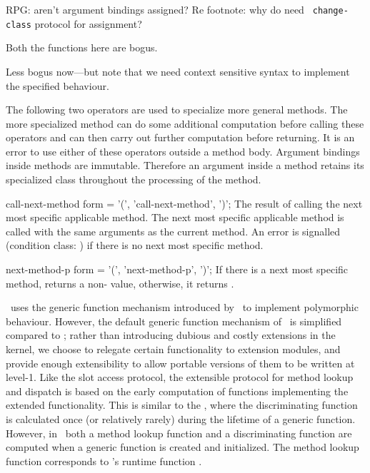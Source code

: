 %
\begin{optPrivate}
    RPG: aren't argument bindings assigned?  Re footnote: why do need {\tt
        change-class} protocol for assignment?

    Both the functions here are bogus.

    Less bogus now---but note that we need context sensitive syntax to implement
    the specified behaviour.
\end{optPrivate}
%
\begin{optDefinition}
The following two operators are used to specialize more general methods.  The
more specialized method can do some additional computation before calling these
operators and can then carry out further computation before returning.  It is an
error to use either of these operators outside a method body.  Argument bindings
inside methods are immutable.  Therefore an
argument inside a method retains its specialized class throughout the processing
of the method.

\Syntax
\savesyntax\callNextMethodSyntax\vbox{\syntax
call-next-method form
   = '(', 'call-next-method', ')';
\endsyntax}
%
\result%
The result of calling the next most specific applicable method.
%
\remarks%
The next most specific applicable method is called with the same
arguments as the current method.  An error is signalled (condition
class: ) if there
is no next most specific method.

\Syntax
\savesyntax\nextMethodPSyntax\vbox{\syntax
next-method-p form
   = '(', 'next-method-p', ')';
\endsyntax}
%
\result%
If there is a next most specific method,  returns a
non-\nil{}\/ value, otherwise, it returns \nil{}.
%
\end{optDefinition}

%
\begin{optRationale}
\telos\ uses the generic function mechanism introduced by \clos\ to
implement polymorphic behaviour.  However, the default generic function
mechanism of \telos\ is simplified compared to \clos; rather than
introducing dubious and costly extensions in the kernel, we choose to
relegate certain functionality to extension modules, and provide
enough extensibility to allow portable versions of them to be written at
level-1.
Like the slot access protocol, the extensible protocol for method
lookup and dispatch is based on the early computation of functions
implementing the extended functionality.  This is similar to the
\closmop, where the discriminating function is calculated once (or
relatively rarely) during the lifetime of a generic function.
However, in \telos\ both a method lookup function and a discriminating
function are computed when a generic function is created and
initialized.  The method lookup function corresponds to \clos's
runtime function .
\end{optRationale}

